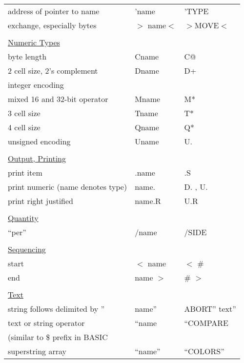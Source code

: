 \begin{tabular}{lll}
address of pointer to name&'name&'TYPE\\
exchange, especially bytes&\(>\) name\(<\)&\(>\)MOVE\(<\)\\
\\
\underline{Numeric Types}\\
byte length&Cname&C@\\
2 cell size, 2's complement&Dname&D+\\
integer encoding\\
mixed 16 and 32-bit operator&Mname&M*\\
3 cell size&Tname&T*\\
4 cell size&Qname&Q*\\
unsigned encoding&Uname&U.\\
\\
\underline{Output, Printing}\\
print item&.name&.S\\
print numeric (name denotes type)&name.&D. , U.\\
print right justified&name.R&U.R\\
\\
\underline{Quantity}\\
``per''&/name&/SIDE\\
\\
\underline{Sequencing}\\
start&\(<\) name&\(<\) \#\\
end&name \(>\)&\# \(>\)\\
\\
\underline{Text}\\
string follows delimited by ''&name''&ABORT'' text''\\
text or string operator&``name&``COMPARE\\
(similar to \$ prefix in BASIC\\
superstring array&``name''&``COLORS''\\
\end{tabular}

